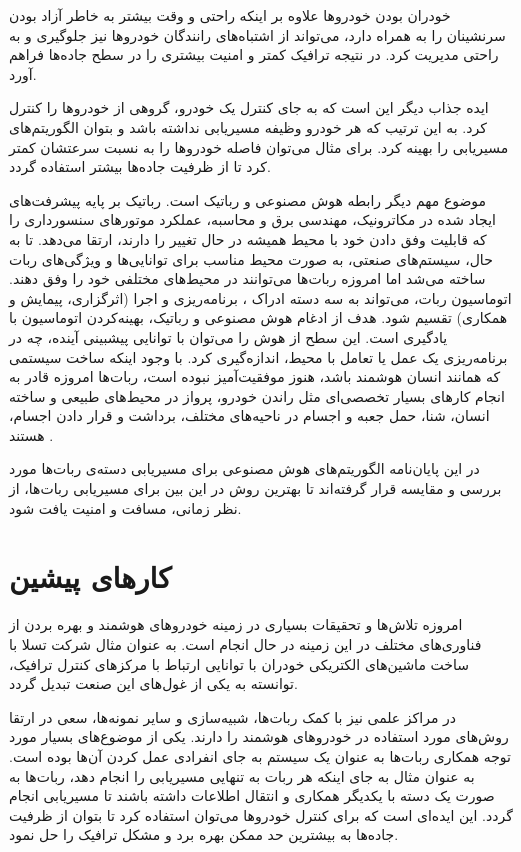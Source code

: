 خودران بودن خودروها علاوه بر اینکه راحتی و وقت بیشتر به خاطر آزاد بودن سرنشینان را به همراه دارد، می‌تواند از اشتباه‌های رانندگان خودروها نیز جلوگیری و به راحتی مدیریت کرد. در نتیجه ترافیک کمتر و امنیت بیشتری را در سطح جاده‌ها فراهم آورد.

ایده جذاب دیگر این است که به جای کنترل یک خودرو، گروهی از خودروها را کنترل کرد. به این ترتیب که هر خودرو وظیفه مسیریابی نداشته باشد و بتوان الگوریتم‌های مسیریابی را بهینه کرد. برای مثال می‌توان فاصله خودروها را به نسبت سرعتشان کمتر کرد تا از ظرفیت جاده‌ها بیشتر استفاده گردد.

موضوع مهم دیگر رابطه هوش مصنوعی و رباتیک است. رباتیک بر پایه پیشرفت‌های ایجاد شده در مکاترونیک، مهندسی برق و محاسبه، عملکرد موتورهای سنسورداری را که قابلیت وفق دادن خود با محیط همیشه در حال تغییر را دارند، ارتقا می‌دهد. تا به حال، سیستم‌های صنعتی، به صورت محیط مناسب برای توانایی‌ها و ویژگی‌های ربات ساخته می‌شد اما امروزه ربات‌ها می‌توانند در محیط‌‌های مختلفی خود را وفق دهند.
اتوماسیون ربات، می‌تواند به سه دسته ادراک ، برنامه‌ریزی و اجرا (اثرگزاری، پیمایش و همکاری) تقسیم شود. هدف از ادغام هوش مصنوعی و رباتیک، بهینه‌کردن اتوماسیون با یادگیری است. این سطح از هوش را می‌توان با توانایی پیشبینی آینده، چه در برنامه‌ریزی یک عمل یا تعامل با محیط، اندازه‌گیری کرد. با وجود اینکه ساخت سیستمی که همانند انسان هوشمند باشد، هنوز موفقیت‌آمیز نبوده است، ربات‌ها امروزه قادر به انجام کارهای بسیار تخصصی‌ای مثل راندن خودرو، پرواز در محیط‌های طبیعی و ساخته انسان، شنا، حمل جعبه و اجسام در ناحیه‌های مختلف، برداشت و قرار دادن اجسام، هستند \cite{perez2018artificial}.

در این پایان‌نامه الگوریتم‌های هوش مصنوعی برای مسیریابی دسته‌ی ربات‌ها مورد بررسی و مقایسه قرار گرفته‌اند تا بهترین روش در این بین برای مسیریابی ربات‌ها، از نظر زمانی، مسافت و امنیت یافت شود.

\section{کارهای پیشین}
امروزه تلاش‌ها و تحقیقات بسیاری در زمینه خودروهای هوشمند و بهره بردن از فناوری‌های مختلف در این زمینه در حال انجام است. به عنوان مثال شرکت تسلا با ساخت ماشین‌های الکتریکی خودران با توانایی ارتباط با مرکزهای کنترل ترافیک، توانسته به یکی از غول‌های این صنعت تبدیل گردد.

در مراکز علمی نیز با کمک ربات‌ها، شبیه‌سازی و سایر نمونه‌ها، سعی در ارتقا روش‌های مورد استفاده در خودروهای هوشمند را دارند. یکی از موضوع‌های بسیار مورد توجه همکاری ربات‌ها به عنوان یک سیستم به جای انفرادی عمل کردن آن‌ها بوده است. به عنوان مثال به جای اینکه هر ربات به تنهایی مسیریابی را انجام دهد، ربات‌ها به صورت یک دسته با یکدیگر همکاری و انتقال اطلاعات داشته باشند تا مسیریابی انجام گردد. این ایده‌ای است که برای کنترل خودروها می‌توان استفاده کرد تا بتوان از ظرفیت جاده‌ها به بیشترین حد ممکن بهره برد و مشکل ترافیک را حل نمود.

